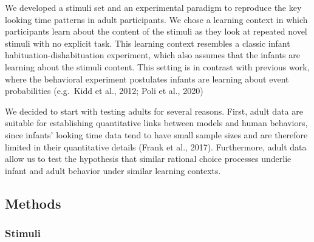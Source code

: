 \documentclass[10pt, letterpaper]{article}
\begin{document}
We developed a stimuli set and an experimental paradigm to reproduce the
key looking time patterns in adult participants. We chose a learning
context in which participants learn about the content of the stimuli as
they look at repeated novel stimuli with no explicit task. This learning
context resembles a classic infant habituation-dishabituation
experiment, which also assumes that the infants are learning about the
stimuli content. This setting is in contrast with previous work, where
the behavioral experiment postulates infants are learning about event
probabilities (e.g.~Kidd et al., 2012; Poli et al., 2020)

We decided to start with testing adults for several reasons. First,
adult data are suitable for establishing quantitative links between
models and human behaviors, since infants' looking time data tend to
have small sample sizes and are therefore limited in their quantitative
details (Frank et al., 2017). Furthermore, adult data allow us to test
the hypothesis that similar rational choice processes underlie infant
and adult behavior under similar learning contexts.

\hypertarget{methods}{%
\subsection{Methods}\label{methods}}

\hypertarget{stimuli}{%
\subsubsection{Stimuli}\label{stimuli}}
\end{document}
